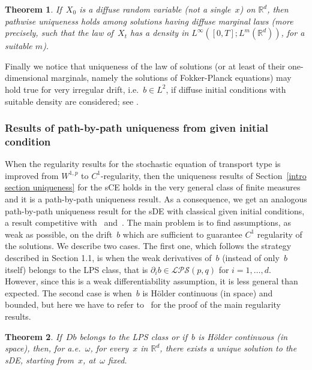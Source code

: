 \documentclass[a4paper,10pt]{article}
\newtheorem{theorem}{Theorem}[section]
\newcommand\1{\mathbbm{1}}
\numberwithin{equation}{section}
\begin{document}
\begin{theorem}
If~$X_0$ is a diffuse random variable \textup{(}not a single~$x$\textup{)} on $\mathbb{R}^d$, then pathwise uniqueness holds among solutions having diffuse marginal laws \textup{(}more precisely, such that the law of~$X_t$ has a density in $L^\infty([0,T];L^m(\mathbb{R}^d))$, for a suitable $m$\textup{)}.
\end{theorem}

Finally we notice that uniqueness of the law of solutions (or at least of their one-dimensional marginals, namely the solutions of Fokker-Planck equations) may hold true for very irregular drift, i.e.~$b\in L^{2}$, if diffuse initial conditions with suitable density are considered; see \cite{FIG08,BOGDAPROE11}.

\subsubsection{Results of path-by-path uniqueness from given initial condition}

When the regularity results for the stochastic equation of transport type is improved from $W^{1,p}$ to $C^{1}$-regularity, then the uniqueness results of Section~\ref{intro section uniqueness} for the sCE holds in the very general class of finite measures and it is a path-by-path uniqueness result. As a consequence, we get an analogous path-by-path uniqueness result for the sDE with classical given initial conditions, a result competitive with~\cite{DAVIE07} and~\cite{CATGUB13}. The main problem is to find assumptions, as weak as possible, on the drift~$b$ which are sufficient to guarantee $C^{1}$ regularity of the solutions. We describe two cases. The first one, which follows the strategy described in Section 1.1, is when the weak derivatives of~$b$ (instead of only~$b$ itself) belongs to the LPS class, that is $\partial _{i}b\in \mathcal{LPS}( p,q) $ for $i =1,\ldots,d$. However, since this is a weak differentiability assumption, it is less general than expected. The second case is when~$b$ is H\"{o}lder continuous (in space) and bounded, but here we have to refer to~\cite{FLAGUBPRI10,FLAGUBPRI12} for the proof of the main regularity results.

\begin{theorem}
If~$Db$ belongs to the LPS class or if~$b$ is H\"older continuous \textup{(}in space\textup{)}, then, for a.e.~$\omega$, for every~$x$ in $\mathbb{R}^d$, there exists a unique solution to the sDE, starting from~$x$, at~$\omega$ fixed.
\end{theorem}
\end{document}
